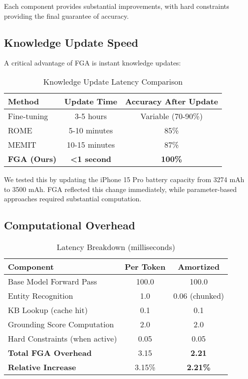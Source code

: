 \documentclass[11pt, a4paper]{article}
\theoremstyle{definition}
\begin{document}
Each component provides substantial improvements, with hard constraints providing the final guarantee of accuracy.

\subsection{Knowledge Update Speed}

A critical advantage of FGA is instant knowledge updates:

\begin{table}[h]
\centering
\caption{Knowledge Update Latency Comparison}
\begin{tabular}{lcc}
\toprule
\textbf{Method} & \textbf{Update Time} & \textbf{Accuracy After Update} \\
\midrule
Fine-tuning & 3-5 hours & Variable (70-90\%) \\
ROME \cite{meng2022locating} & 5-10 minutes & 85\% \\
MEMIT \cite{meng2023memit} & 10-15 minutes & 87\% \\
\textbf{FGA (Ours)} & \textbf{<1 second} & \textbf{100\%} \\
\bottomrule
\end{tabular}
\end{table}

We tested this by updating the iPhone 15 Pro battery capacity from 3274 mAh to 3500 mAh. FGA reflected this change immediately, while parameter-based approaches required substantial computation.

\subsection{Computational Overhead}

\begin{table}[h]
\centering
\caption{Latency Breakdown (milliseconds)}
\begin{tabular}{lcc}
\toprule
\textbf{Component} & \textbf{Per Token} & \textbf{Amortized} \\
\midrule
Base Model Forward Pass & 100.0 & 100.0 \\
Entity Recognition & 1.0 & 0.06 (chunked) \\
KB Lookup (cache hit) & 0.1 & 0.1 \\
Grounding Score Computation & 2.0 & 2.0 \\
Hard Constraints (when active) & 0.05 & 0.05 \\
\midrule
\textbf{Total FGA Overhead} & 3.15 & \textbf{2.21} \\
\textbf{Relative Increase} & 3.15\% & \textbf{2.21\%} \\
\bottomrule
\end{tabular}
\end{table}
\end{document}
